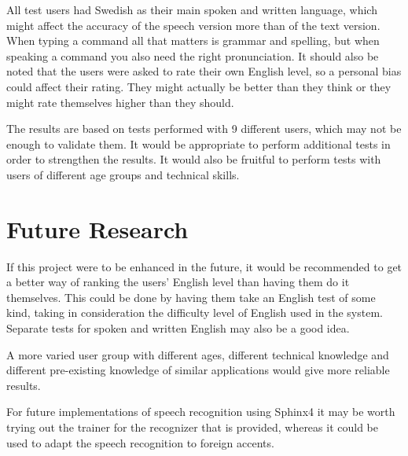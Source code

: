 All test users had Swedish as their main spoken and written language, which might affect the accuracy of the speech version more than of the text version. When typing a command all that matters is grammar and spelling, but when speaking a command you also need the right pronunciation. It should also be noted that the users were asked to rate their own English level, so a personal bias could affect their rating. They might actually be better than they think or they might rate themselves higher than they should.

The results are based on tests performed with 9 different users, which may not be enough to validate them. It would be appropriate to perform additional tests in order to strengthen the results. It would also be fruitful to perform tests with users of different age groups and technical skills.

\section{Future Research}
If this project were to be enhanced in the future, it would be recommended to get a better way of ranking the users' English level than having them do it themselves. This could be done by having them take an English test of some kind, taking in consideration the difficulty level of English used in the system. Separate tests for spoken and written English may also be a good idea.

A more varied user group with different ages, different technical knowledge and different pre-existing knowledge of similar applications would give more reliable results.

For future implementations of speech recognition using Sphinx4 it may be worth trying out the trainer for the recognizer that is provided, whereas it could be used to adapt the speech recognition to foreign accents.
